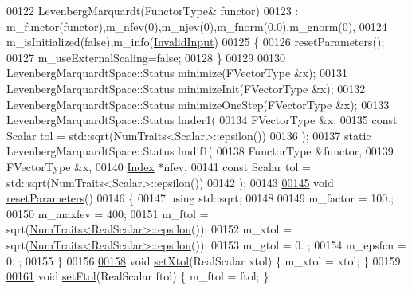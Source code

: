 \begin{DoxyCode}
00122     LevenbergMarquardt(FunctorType& functor) 
00123     : m\_functor(functor),m\_nfev(0),m\_njev(0),m\_fnorm(0.0),m\_gnorm(0),
00124       m\_isInitialized(false),m\_info(\hyperlink{group__enums_gga85fad7b87587764e5cf6b513a9e0ee5ea945604f62795ffc70aedf2bd12ea0434}{InvalidInput})
00125     \{
00126       resetParameters();
00127       m\_useExternalScaling=\textcolor{keyword}{false}; 
00128     \}
00129     
00130     LevenbergMarquardtSpace::Status minimize(FVectorType &x);
00131     LevenbergMarquardtSpace::Status minimizeInit(FVectorType &x);
00132     LevenbergMarquardtSpace::Status minimizeOneStep(FVectorType &x);
00133     LevenbergMarquardtSpace::Status lmder1(
00134       FVectorType  &x, 
00135       \textcolor{keyword}{const} Scalar tol = std::sqrt(NumTraits<Scalar>::epsilon())
00136     );
00137     \textcolor{keyword}{static} LevenbergMarquardtSpace::Status lmdif1(
00138             FunctorType &functor,
00139             FVectorType  &x,
00140             \hyperlink{namespace_eigen_a62e77e0933482dafde8fe197d9a2cfde}{Index} *nfev,
00141             \textcolor{keyword}{const} Scalar tol = std::sqrt(NumTraits<Scalar>::epsilon())
00142             );
00143     
\hyperlink{class_eigen_1_1_levenberg_marquardt_a16172a2048058ea0a908213a7b0f8971}{00145}     \textcolor{keywordtype}{void} \hyperlink{class_eigen_1_1_levenberg_marquardt_a16172a2048058ea0a908213a7b0f8971}{resetParameters}() 
00146     \{
00147       \textcolor{keyword}{using} std::sqrt;        
00148 
00149       m\_factor = 100.; 
00150       m\_maxfev = 400; 
00151       m\_ftol = sqrt(\hyperlink{group___core___module_struct_eigen_1_1_num_traits}{NumTraits<RealScalar>::epsilon}());
00152       m\_xtol = sqrt(\hyperlink{group___core___module_struct_eigen_1_1_num_traits}{NumTraits<RealScalar>::epsilon}());
00153       m\_gtol = 0. ; 
00154       m\_epsfcn = 0. ;
00155     \}
00156     
\hyperlink{class_eigen_1_1_levenberg_marquardt_a691b571366630f1329d2de7a5e40e7a5}{00158}     \textcolor{keywordtype}{void} \hyperlink{class_eigen_1_1_levenberg_marquardt_a691b571366630f1329d2de7a5e40e7a5}{setXtol}(RealScalar xtol) \{ m\_xtol = xtol; \}
00159     
\hyperlink{class_eigen_1_1_levenberg_marquardt_a09c0852c6a4534b84a16ac5d9c631c12}{00161}     \textcolor{keywordtype}{void} \hyperlink{class_eigen_1_1_levenberg_marquardt_a09c0852c6a4534b84a16ac5d9c631c12}{setFtol}(RealScalar ftol) \{ m\_ftol = ftol; \}

\end{DoxyCode}
